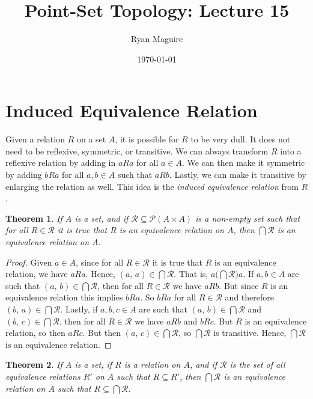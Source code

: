 \documentclass{article}
\title{Point-Set Topology: Lecture 15}
\author{Ryan Maguire}
\date{\today}
\theoremstyle{plain}
\newtheorem{theorem}{Theorem}[section]
\theoremstyle{normal}
\begin{document}
    \maketitle
    \section{Induced Equivalence Relation}
        Given a relation $R$ on a set $A$, it is possible for $R$ to be very
        dull. It does not need to be reflexive, symmetric, or transitive. We
        can always transform $R$ into a reflexive relation by adding in
        $aRa$ for all $a\in{A}$. We can then make it symmetric by adding
        $bRa$ for all $a,b\in{A}$ such that $aRb$. Lastly, we can make it
        transitive by enlarging the relation as well. This idea is the
        \textit{induced equivalence relation} from $R$.
        \begin{theorem}
            If $A$ is a set, and if
            $\mathcal{R}\subseteq\mathcal{P}(A\times{A})$ is a non-empty set
            such that for all $R\in\mathcal{R}$ it is true that $R$ is an
            equivalence relation on $A$, then $\bigcap\mathcal{R}$ is an
            equivalence relation on $A$.
        \end{theorem}
        \begin{proof}
            Given $a\in{A}$, since for all $R\in\mathcal{R}$ it is true that
            $R$ is an equivalence relation, we have $aRa$.
            Hence, $(a,\,a)\in\bigcap\mathcal{R}$. That is,
            $a\big(\bigcap\mathcal{R}\big)a$. If $a,b\in{A}$ are such that
            $(a,\,b)\in\bigcap\mathcal{R}$, then for all $R\in\mathcal{R}$ we
            have $aRb$. But since $R$ is an equivalence relation this implies
            $bRa$. So $bRa$ for all $R\in\mathcal{R}$ and therefore
            $(b,\,a)\in\bigcap\mathcal{R}$. Lastly, if $a,b,c\in{A}$ are such
            that $(a,\,b)\in\bigcap\mathcal{R}$ and
            $(b,\,c)\in\bigcap\mathcal{R}$, then for all $R\in\mathcal{R}$ we
            have $aRb$ and $bRc$. But $R$ is an equivalence relation, so then
            $aRc$. But then $(a,\,c)\in\bigcap\mathcal{R}$, so
            $\bigcap\mathcal{R}$ is transitive. Hence, $\bigcap\mathcal{R}$ is
            an equivalence relation.
        \end{proof}
        \begin{theorem}
            If $A$ is a set, if $R$ is a relation on $A$, and if
            $\mathcal{R}$ is the set of all equivalence relations
            $R'$ on $A$ such that $R\subseteq{R}'$, then
            $\bigcap\mathcal{R}$ is an equivalence relation on $A$ such that
            $R\subseteq\bigcap\mathcal{R}$.
        \end{theorem}
\end{document}

